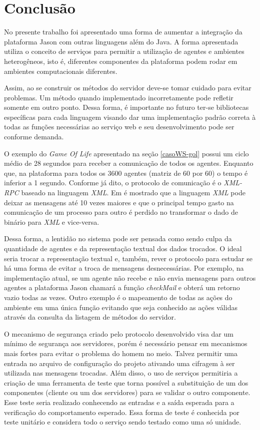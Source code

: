 \chapter{Conclusão} \label{chap-conclusao}

No presente trabalho foi apresentado uma forma de aumentar a integração da
plataforma Jason com outras linguagens além do Java. A forma apresentada
utiliza o conceito de serviços para permitir a utilização de agentes e
ambientes heterogêneos, isto é, diferentes componentes da plataforma podem
rodar em ambientes computacionais diferentes.

Assim, ao se construir os métodos do servidor deve-se tomar cuidado para
evitar problemas. Um método quando implementado incorretamente pode refletir
somente em outro ponto. Dessa forma, é importante no futuro ter-se bibliotecas
específicas para cada linguagem visando dar uma implementação padrão correta à
todas as funções necessárias ao serviço web e seu desenvolvimento pode ser
conforme demanda.

O exemplo do \emph{Game Of Life} apresentado na seção \ref{casoWS-gol} possui
um ciclo médio de 28 segundos para receber a comunicação de todos os agentes.
Enquanto que, na plataforma para todos os 3600 agentes (matriz de 60 por 60) o
tempo é inferior a 1 segundo. Conforme já dito, o protocolo de comunicação
é o \emph{XML-RPC} baseado na linguagem \emph{XML}. Em
\cite{kohlhoff2003evaluating} é mostrado que a linguagem \emph{XML} pode
deixar as
mensagens até 10 vezes maiores e que o principal tempo gasto na comunicação
de um processo para outro é perdido no transformar o dado de binário para
\emph{XML} e vice-versa.

Dessa forma, a lentidão no sistema pode ser pensada como sendo culpa da
quantidade de agentes e da representação textual dos dados trocados. O ideal
seria trocar a representação textual e, também, rever o protocolo para estudar
se há uma forma de evitar a troca de mensagens desnecessárias. Por exemplo, na
implementação atual, se um agente não recebe e não envia mensagens para outros
agentes a plataforma Jason chamará a função \emph{checkMail} e obterá um
retorno vazio todas as vezes. Outro exemplo é o mapeamento de todas as ações
do ambiente em uma única função evitando que seja conhecido as ações
válidas através da consulta da listagem de métodos do servidor.

O mecanismo de segurança criado pelo protocolo desenvolvido visa dar um mínimo de
segurança aos servidores, porém é necessário pensar em mecanismos mais
fortes para evitar o problema do homem no meio. Talvez permitir uma
entrada no arquivo de configuração do projeto ativando uma cifragem à ser
utilizada nas mensagens trocadas. Além disso, o uso de serviços
permitiria a criação de uma ferramenta de teste que torna possível a
substituição de um dos componentes (cliente ou um dos servidores) para se
validar o outro componente. Esse teste seria realizado conhecendo as entradas e a
saída esperada para a verificação do comportamento esperado. Essa forma de
teste é conhecida por teste unitário e considera todo o serviço sendo testado
como uma só unidade.

